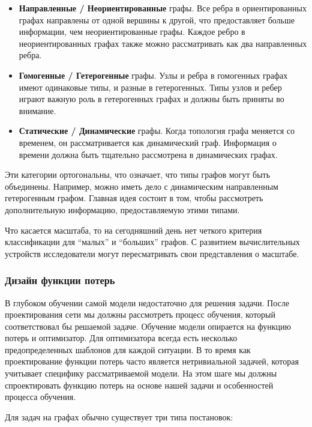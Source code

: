 \documentclass[12pt]{article}
\begin{document}
\begin{itemize}
    \item \textbf{Направленные / Неориентированные} графы. Все ребра в ориентированных графах направлены от одной вершины к другой, что предоставляет больше информации, чем неориентированные графы. Каждое ребро в неориентированных графах также можно рассматривать как два направленных ребра. 
    
    \item \textbf{Гомогенные / Гетерогенные} графы. Узлы и ребра в гомогенных графах имеют одинаковые типы, и разные в гетерогенных. Типы узлов и ребер играют важную роль в гетерогенных графах и должны быть приняты во внимание. 
    
    \item \textbf{Статические / Динамические} графы. Когда топология графа меняется со временем, он рассматривается как динамический граф. Информация о времени должна быть тщательно рассмотрена в динамических графах. 
    
\end{itemize}

Эти категории ортогональны, что означает, что типы графов могут быть объединены. Например, можно иметь дело с динамическим направленным гетерогенным графом. Главная идея состоит в том, чтобы рассмотреть дополнительную информацию, предоставляемую этими типами.

Что касается масштаба, то на сегодняшний день нет четкого критерия классификации для “малых” и “больших” графов. С развитием вычислительных устройств исследователи могут пересматривать свои представления о масштабе.

\subsubsection{Дизайн функции потерь}

В глубоком обучении самой модели недостаточно для решения задачи. После проектирования сети мы должны рассмотреть процесс обучения, который соответствовал бы решаемой задаче. Обучение модели опирается на функцию потерь и оптимизатор. Для оптимизатора всегда есть несколько предопределенных шаблонов для каждой ситуации. В то время как проектирование функции потерь часто является нетривиальной задачей, которая учитывает специфику рассматриваемой модели. На этом шаге мы должны спроектировать функцию потерь на основе нашей задачи и особенностей процесса обучения. 

Для задач на графах обычно существует три типа постановок: 
\end{document}
